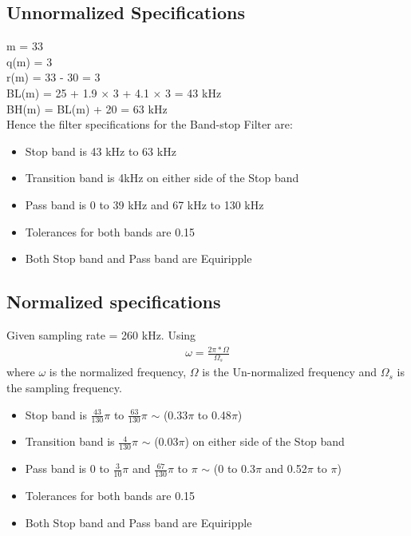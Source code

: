 \documentclass[12pt]{article}
\begin{document}
\subsection{Unnormalized Specifications}
\color{black}
m = 33\\
q(m) = 3\\
r(m) = 33 - 30 = 3\\
BL(m) = 25 + 1.9 $\times$ 3 + 4.1 $\times$ 3 = 43 kHz\\
BH(m) = BL(m) + 20 = 63 kHz\\

\noindent Hence the filter specifications for the Band-stop Filter are:
\begin{itemize}
	\item Stop band is 43 kHz to 63 kHz
	\item Transition band is 4kHz on either side of the Stop band
	\item Pass band is 0 to 39 kHz and 67 kHz to 130 kHz
	\item Tolerances for both bands are 0.15
	\item Both Stop band and Pass band are Equiripple

\end{itemize}

\color{cyan}
\subsection{Normalized specifications}
\color{black}
Given sampling rate  = 260 kHz. Using\\
\begin{gather*}
	\omega = \frac{2\pi \ast \Omega}{\Omega_s}
\end{gather*}
where $\omega$ is the normalized frequency, $\Omega$ is the Un-normalized frequency and $\Omega_s$ is the sampling frequency.
\begin{itemize}
	\item Stop band is $\frac{43}{130}\pi$ to $\frac{63}{130}\pi$ $\sim$ (0.33$\pi$ to 0.48$\pi$)
	\item Transition band is $\frac{4}{130}\pi$ $\sim$ (0.03$\pi$) on either side of the Stop band
	\item Pass band is 0 to  $\frac{3}{10}\pi$ and $\frac{67}{130}\pi$ to $\pi$  $\sim$ (0 to 0.3$\pi$ and  0.52$\pi$ to $\pi$)
	\item Tolerances for both bands are 0.15
	\item Both Stop band and Pass band are Equiripple
\end{itemize}
\end{document}
